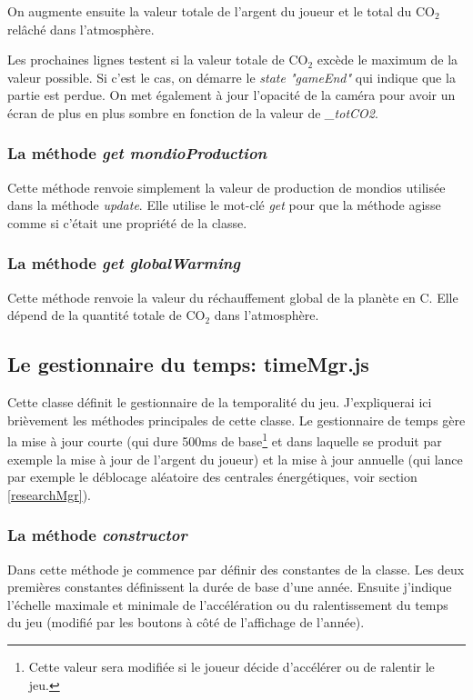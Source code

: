 \documentclass{article}
\begin{document}
		
		On augmente ensuite la valeur totale de l'argent du joueur et le total du CO$_{2}$ relâché dans l'atmosphère.
		
		
		Les prochaines lignes testent si la valeur totale de CO$_{2}$ excède le maximum de la valeur possible. Si c'est le cas, on démarre le \textit{state "gameEnd"} qui indique que la partie est perdue. On met également à jour l'opacité de la caméra pour avoir un écran de plus en plus sombre en fonction de la valeur de \textit{\_totCO2}.
		
		\subsubsection{La méthode \textit{get mondioProduction}} \label{mondioProduction}
		Cette méthode renvoie simplement la valeur de production de mondios utilisée dans la méthode \textit{update}. Elle utilise le mot-clé \textit{get} pour que la méthode agisse comme si c'était une propriété de la classe.
		
		\subsubsection{La méthode \textit{get globalWarming}} \label{globalWarming}
		Cette méthode renvoie la valeur du réchauffement global de la planète en \degree C. Elle dépend de la quantité totale de CO$_{2}$ dans l'atmosphère.
		
		\subsection{Le gestionnaire du temps: timeMgr.js} \label{timeMgr}
		
		
		Cette classe définit le gestionnaire de la temporalité du jeu. J'expliquerai ici brièvement les méthodes principales de cette classe. Le gestionnaire de temps gère la mise à jour courte (qui dure 500ms de base\footnote{Cette valeur sera modifiée si le joueur décide d'accélérer ou de ralentir le jeu.} et dans laquelle se produit par exemple la mise à jour de l'argent du joueur) et la mise à jour annuelle (qui lance par exemple le déblocage aléatoire des centrales énergétiques, voir section \ref{researchMgr}).
		
		\subsubsection{La méthode \textit{constructor}}
		Dans cette méthode je commence par définir des constantes de la classe. Les deux premières constantes définissent la durée de base d'une année. Ensuite j'indique l'échelle maximale et minimale de l'accélération ou du ralentissement du temps du jeu (modifié par les boutons à côté de l'affichage de l'année).
		
\end{document}
